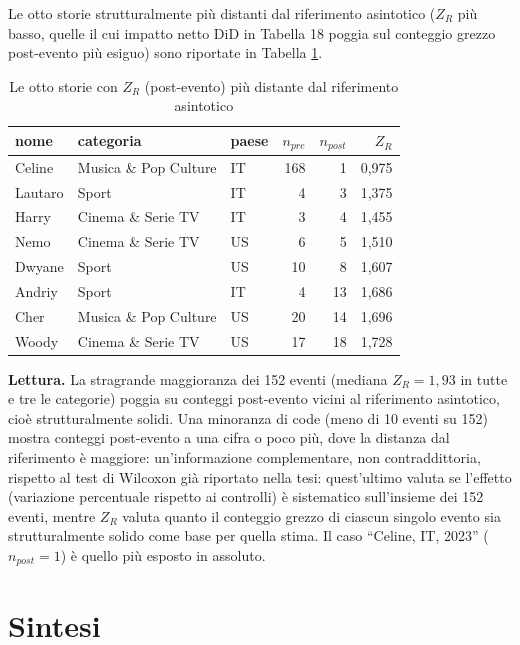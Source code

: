 \documentclass[conference]{IEEEtran}
\begin{document}
Le otto storie strutturalmente più distanti dal riferimento asintotico ($Z_R$ più basso,
quelle il cui impatto netto DiD in Tabella 18 poggia sul conteggio grezzo post-evento più
esiguo) sono riportate in Tabella \ref{tab:eventstudy_fragili}.

\begin{table}[t]
\centering
\footnotesize
\caption{Le otto storie con $Z_R$ (post-evento) più distante dal riferimento asintotico}
\label{tab:eventstudy_fragili}
\begin{tabular}{l l l r r r}
\toprule
\textbf{nome} & \textbf{categoria} & \textbf{paese} & \textbf{$n_{pre}$} & \textbf{$n_{post}$} & \textbf{$Z_R$} \\
\midrule
Celine  & Musica \& Pop Culture & IT & 168 & 1  & 0,975 \\
Lautaro & Sport                 & IT & 4   & 3  & 1,375 \\
Harry   & Cinema \& Serie TV    & IT & 3   & 4  & 1,455 \\
Nemo    & Cinema \& Serie TV    & US & 6   & 5  & 1,510 \\
Dwyane  & Sport                 & US & 10  & 8  & 1,607 \\
Andriy  & Sport                 & IT & 4   & 13 & 1,686 \\
Cher    & Musica \& Pop Culture & US & 20  & 14 & 1,696 \\
Woody   & Cinema \& Serie TV    & US & 17  & 18 & 1,728 \\
\bottomrule
\end{tabular}
\end{table}

\textbf{Lettura.} La stragrande maggioranza dei 152 eventi (mediana $Z_R = 1{,}93$ in tutte e
tre le categorie) poggia su conteggi post-evento vicini al riferimento asintotico, cioè
strutturalmente solidi. Una minoranza di code (meno di 10 eventi su 152) mostra conteggi
post-evento a una cifra o poco più, dove la distanza dal riferimento è maggiore: un'informazione
complementare, non contraddittoria, rispetto al test di Wilcoxon già riportato nella tesi:
quest'ultimo valuta se l'effetto (variazione percentuale rispetto ai controlli) è sistematico
sull'insieme dei 152 eventi, mentre $Z_R$ valuta quanto il conteggio grezzo di ciascun singolo
evento sia strutturalmente solido come base per quella stima. Il caso ``Celine, IT, 2023''
($n_{post}=1$) è quello più esposto in assoluto.

\section{Sintesi}
\end{document}
